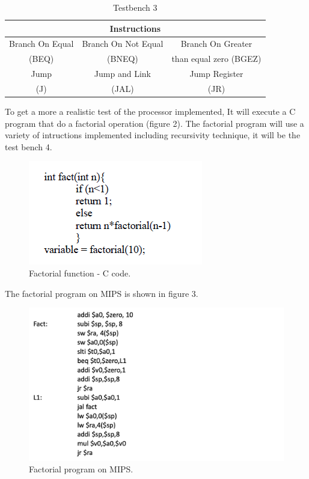 \documentclass[conference]{IEEEtran}
\begin{document}
\FloatBarrier
\begin{table}[htbp]
	\caption{Testbench 3} %
	\begin{center}
		\begin{tabular}{|c|c|c|}
			\hline
			\multicolumn{3}{|c|}{\textbf{Instructions}} \\
			\hline
			Branch On Equal&Branch On Not Equal&Branch On Greater \\
			(BEQ)&(BNEQ)&than equal zero (BGEZ)  \\
			\hline
			Jump&Jump and Link&Jump Register\\
			(J)&(JAL)&(JR) \\
			\hline
		\end{tabular}
		\label{tab_test3}
	\end{center}
\end{table}
\FloatBarrier

To get a more a realistic test of the processor implemented, It will execute a C program that do a factorial operation (figure 2). The factorial program will use a variety of  intructions implemented including recursivity technique, it will be the test bench 4.
\begin{figure}[h]
\begin{center}
\includegraphics[scale=0.8]{factorial_c.png}
\caption{Factorial function - C code.}
\label{fact_c}
\end{center}
\end{figure}

The factorial program on MIPS is shown in figure 3.
\begin{figure}[h]
\begin{center}
\includegraphics[scale=0.45]{MIPS_Factorial.png}
\caption{Factorial program on MIPS.}
\label{fact_mips}
\end{center}
\end{figure}
 
\end{document}
